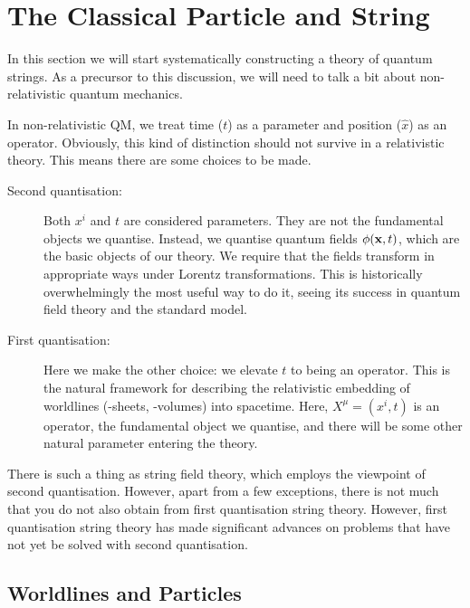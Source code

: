 
\section{The Classical Particle and String}%
\label{sec:the_classical_particle_and_string}

In this section we will start systematically constructing a theory of quantum strings.
As a precursor to this discussion, we will need to talk a bit about non-relativistic quantum mechanics.

In non-relativistic QM, we treat time ($t$) as a parameter and position ($\hat{x}$) as an operator.
Obviously, this kind of distinction should not survive in a relativistic theory. This means there are some choices to be made. 

\begin{description}
  \item[Second quantisation:] Both $x^{i}$ and $t$ are considered parameters. They are not the fundamental objects we quantise. Instead, we quantise quantum fields $\phi(\vb{x}, t)$, which are the basic objects of our theory.
    We require that the fields transform in appropriate ways under Lorentz transformations.
    This is historically overwhelmingly the most useful way to do it, seeing its success in quantum field theory and the standard model.
  \item[First quantisation:] Here we make the other choice: we elevate $t$ to being an operator.
    This is the natural framework for describing the relativistic embedding of worldlines (-sheets, -volumes) into spacetime.
    Here, $X^{\mu} = (x^{i}, t)$ is an operator, the fundamental object we quantise, and there will be some other natural parameter entering the theory.
\end{description}

There is such a thing as string field theory, which employs the viewpoint of second quantisation. However, apart from a few exceptions, there is not much that you do not also obtain from first quantisation string theory.
However, first quantisation string theory has made significant advances on problems that have not yet be solved with second quantisation.

\subsection{Worldlines and Particles}%
\label{sub:worldlines_and_particles}

